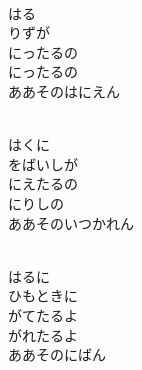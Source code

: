\documentclass[10pt,b5j]{tarticle} %
\begin{document}
\vspace{1.5em} %
\newcommand{\linespace}{0.5em} %
\newcommand{\blocksize}{0.5\hsize} %
\newcommand{\itemmargin}{6em} %
\begin{enumerate} %
    \setlength{\itemindent}{\itemmargin} %
    \begin{minipage}[c]{\blocksize}
    
        \vspace{\linespace}
        \item~\\
        はる\\
        りずが\\
        にったるの\\
        にったるの\\
        ああそのはにえん
        
        \vspace{\linespace}
        \item~\\
        はくに\\
        をばいしが\\
        にえたるの\\
        にりしの\\
        ああそのいつかれん
        
        \vspace{\linespace}
        \item~\\
        はるに\\
        ひもときに\\
        がてたるよ\\
        がれたるよ\\
        ああそのにばん
    
    \end{minipage}
\end{enumerate} %
\end{document}
